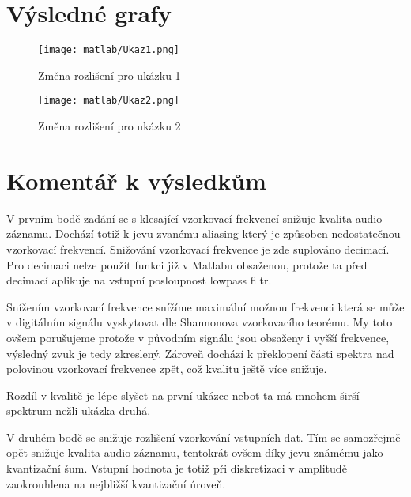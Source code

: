 \documentclass[11pt, a4paper]{article}
\begin{document}
    \section{Výsledné grafy}
    
        \begin{figure}[H]
            \centering
            \texttt{[image: matlab/Ukaz1.png]}
            \caption{Změna rozlišení pro ukázku 1}
            \label{fig:graf1}
        \end{figure}
        
        \begin{figure}[H]
            \centering
            \texttt{[image: matlab/Ukaz2.png]}
            \caption{Změna rozlišení pro ukázku 2}
            \label{fig:graf2}
        \end{figure}
        
    \section{Komentář k výsledkům}
        
        V prvním bodě zadání se s klesající vzorkovací frekvencí 
        snižuje kvalita audio záznamu. Dochází totiž k jevu zvanému 
        aliasing který je způsoben nedostatečnou vzorkovací frekvencí. 
        Snižování vzorkovací frekvence je zde suplováno decimací. Pro 
        decimaci nelze použít funkci již v Matlabu obsaženou, protože 
        ta před decimací aplikuje na vstupní posloupnost lowpass filtr.
        
        Snížením vzorkovací frekvence snížíme maximální možnou 
        frekvenci která se může v digitálním signálu vyskytovat dle 
        Shannonova vzorkovacího teorému. My toto ovšem porušujeme 
        protože v původním signálu jsou obsaženy i vyšší frekvence, 
        výsledný zvuk je tedy zkreslený. Zároveň dochází k překlopení 
        části spektra nad polovinou vzorkovací frekvence zpět, což 
        kvalitu ještě více snižuje.
        
        Rozdíl v kvalitě je lépe slyšet na první ukázce neboť ta má 
        mnohem širší spektrum nežli ukázka druhá.
        
        V druhém bodě se snižuje rozlišení vzorkování vstupních dat. 
        Tím se samozřejmě opět snižuje kvalita audio záznamu, tentokrát 
        ovšem díky jevu známému jako kvantizační šum. Vstupní hodnota 
        je totiž při diskretizaci v amplitudě zaokrouhlena na nejbližší 
        kvantizační úroveň.
        
\end{document}
